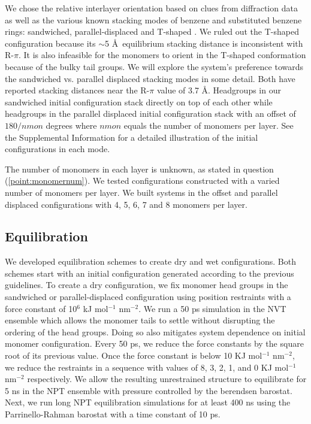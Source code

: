\documentclass[journal=jpcbfk,manusciprt=article]{achemso}
\begin{document}

  We chose the relative interlayer orientation based on clues from diffraction
  data as well as the various known stacking modes of benzene and substituted
  benzene rings: sandwiched, parallel-displaced and T-shaped
  \cite{sinnokrot_estimates_2002}. We ruled out the T-shaped configuration
  because its $\sim$5 \AA~equilibrium stacking distance
  \cite{sinnokrot_estimates_2002} is inconsistent with R-$\pi$. It is also
  infeasible for the monomers to orient in the T-shaped conformation because of
  the bulky tail groups. We will explore the system's preference towards the
  sandwiched vs. parallel displaced stacking modes in some detail. Both have
  reported stacking distances near the R-$\pi$ value of 3.7 \AA. Headgroups in
  our sandwiched initial configuration stack directly on top of each other while
  headgroups in the parallel displaced initial configuration stack with an offset
  of $180/nmon$ degrees where $nmon$ equals the number of monomers per layer. See
  the Supplemental Information for a detailed illustration of the initial
  configurations in each mode.

  The number of monomers in each layer is unknown, as stated in question
  (\ref{point:monomernum}). We tested configurations constructed with a varied
  number of monomers per layer. We built systems in the offset and parallel
  displaced configurations with 4, 5, 6, 7 and 8 monomers per layer.

  \subsection{Equilibration}

  We developed equilibration schemes to create dry and wet configurations. Both
  schemes start with an initial configuration generated according to the previous
  guidelines. To create a dry configuration, we fix monomer head groups in the
  sandwiched or parallel-displaced configuration using position restraints with a
  force constant of 10$^6$ kJ mol$^{-1}$ nm$^{-2}$. We run a 50 ps simulation in
  the NVT ensemble which allows the monomer tails to settle without disrupting
  the ordering of the head groups. Doing so also mitigates system dependence on
  initial monomer configuration. Every 50 ps, we reduce the force constants by
  the square root of its previous value. Once the force constant is below 10 KJ
  mol$^{-1}$ nm$^{-2}$, we reduce the restraints in a sequence with values of
  8, 3, 2, 1, and 0 KJ mol$^{-1}$ nm$^{-2}$ respectively. We allow the resulting
  unrestrained structure to equilibrate for 5 ns in the NPT ensemble
  with pressure controlled by the berendsen barostat. Next, we run long NPT
  equilibration simulations for at least 400 ns using the Parrinello-Rahman
  barostat with a time constant of 10 ps.
\end{document}
